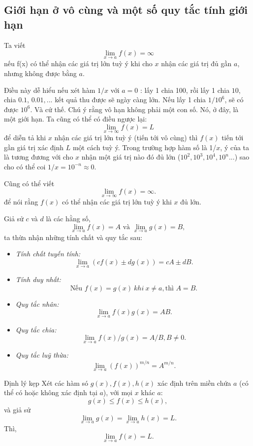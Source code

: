 \subsection{Giới hạn ở vô cùng và một số quy tắc tính giới hạn}
\begin{definition} Ta viết
    \begin{equation*}\lim_{x\rightarrow a}f(x)=\infty\end{equation*}
nếu f(x) có thể nhận các giá trị lớn tuỳ ý khi cho $x$ nhận các giá trị đủ gần $a$, nhưng không được bằng $a$.
\end{definition}
Điều này dễ hiểu nếu xét hàm $1/x$ với $a=0$ : lấy 1 chia 100, rồi lấy 1 chia $10$, chia $0.1$, $0.01,...$ kết quả thu được sẽ ngày càng lớn. Nếu lấy 1 chia $1/10^6$, sẽ có được $10^6$. Và cứ thế.
Chú ý rằng vô hạn không phải một con số. Nó, ở đây, là một giới hạn.\newline
Ta cũng có thể có điều ngược lại:$$\lim_{x\rightarrow\infty}f(x)=L$$ để diễn tả khi $x$ nhận các giá trị lớn tuỳ ý (tiến tới vô cùng) thì $f(x)$ tiến tới gần giá trị xác định $L$ một cách tuỳ ý. Trong trường hợp hàm số là 1/$x$, ý của ta là tương đương với cho $x$ nhận một giá trị nào đó đủ lớn ($10^2,10^3,10^4,10^n...$) sao cho có thể coi $1/x =10^{-n}\approx 0.$ 

Cũng có thể viết  $$\lim_{x\rightarrow\infty}f(x)=\infty.$$ để nói rằng $f(x)$ có thể nhận các giá trị lớn tuỳ ý khi $x$ đủ lớn.\newline    
\vspace{5pt}

 Giả sử $c$ và $d$ là các hằng số, \[\lim_{x\rightarrow a}f(x)=A \text{ và } \lim_{x\rightarrow a}g(x)=B, \] ta thừa nhận những tính chất và quy tắc sau:
\begin{itemize}
 \item \emph{Tính chất tuyến tính:} \[\lim_{x\rightarrow a}(cf(x)\pm dg(x))=cA \pm dB.\]
 \item \emph{Tính duy nhất:} \[\text{Nếu } f(x)=g(x)~khi~x\neq a,\text{thì } A=B.\]
 \item \emph{Quy tắc nhân:} \[\lim_{x\rightarrow a}f(x)g(x)=AB.\]
 \item \emph{Quy tắc chia:} \[\lim_{x\rightarrow a}f(x)/g(x)=A/B, B\neq 0.\]
 \item \emph{Quy tắc luỹ thừa:} \[\lim_{x\rightarrow a}(f(x))^{m/n}=A^{m/n}.\]
\end{itemize}
\begin{theorem}{Định lý kẹp}
    Xét các hàm só $g(x), f(x), h(x)$ xác định trên miền chứa $a$ (có thể có hoặc không xác định tại $a$), với mọi $x$ khác $a$:
    \[g(x)\leq f(x)\leq h(x),\] và giả sử \[\lim_{x\rightarrow a}g(x)=\lim_{x\rightarrow a}h(x)=L.\]
    Thì, \[\lim_{x\rightarrow a}f(x)=L.\]
\end{theorem}